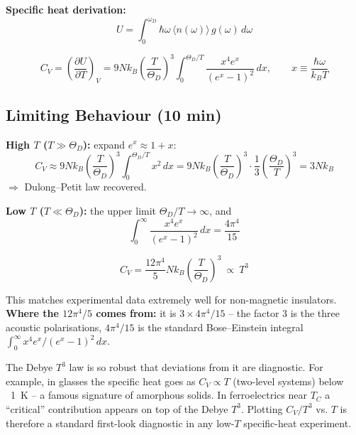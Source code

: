 \documentclass[11pt,a4paper]{article}
\begin{document}
\textbf{Specific heat derivation:}
\[
U = \int_0^{\omega_D}\hbar\omega\,\langle n(\omega)\rangle\,g(\omega)\,d\omega
\]
\begin{keybox}
\[
C_V = \left(\frac{\partial U}{\partial T}\right)_V
= 9Nk_B\left(\frac{T}{\Theta_D}\right)^3 \int_0^{\Theta_D/T}\frac{x^4e^x}{(e^x-1)^2}\,dx,
\qquad x\equiv\frac{\hbar\omega}{k_BT}
\]
\end{keybox}

\subsection{Limiting Behaviour \hfill \small(10 min)}

\textbf{High $T$ ($T\gg\Theta_D$):} expand $e^x\approx1+x$:
\[
C_V \approx 9Nk_B\left(\frac{T}{\Theta_D}\right)^3\int_0^{\Theta_D/T}x^2\,dx
= 9Nk_B\left(\frac{T}{\Theta_D}\right)^3\cdot\frac13\left(\frac{\Theta_D}{T}\right)^3
= 3Nk_B
\]
$\Rightarrow$ Dulong--Petit law recovered.

\textbf{Low $T$ ($T\ll\Theta_D$):} the upper limit $\Theta_D/T\to\infty$, and
\[
\int_0^\infty \frac{x^4e^x}{(e^x-1)^2}\,dx = \frac{4\pi^4}{15}
\]
\begin{keybox}
\[
C_V = \frac{12\pi^4}{5}Nk_B\left(\frac{T}{\Theta_D}\right)^3 \ \propto\ T^3
\]
\end{keybox}
This matches experimental data extremely well for non-magnetic insulators.
\textbf{Where the $12\pi^4/5$ comes from:} it is $3 \times 4\pi^4/15$ -- the
factor 3 is the three acoustic polarisations, $4\pi^4/15$ is the standard
Bose--Einstein integral $\int_0^\infty x^4 e^x/(e^x-1)^2\,dx$.

\begin{expbox}
The Debye $T^3$ law is so robust that deviations from it are diagnostic. For
example, in glasses the specific heat goes as $C_V \propto T$ (two-level systems)
below ~1~K -- a famous signature of amorphous solids. In ferroelectrics near $T_C$
a ``critical'' contribution appears on top of the Debye $T^3$. Plotting $C_V/T^3$
vs. $T$ is therefore a standard first-look diagnostic in any low-$T$ specific-heat
experiment.
\end{expbox}
\end{document}
